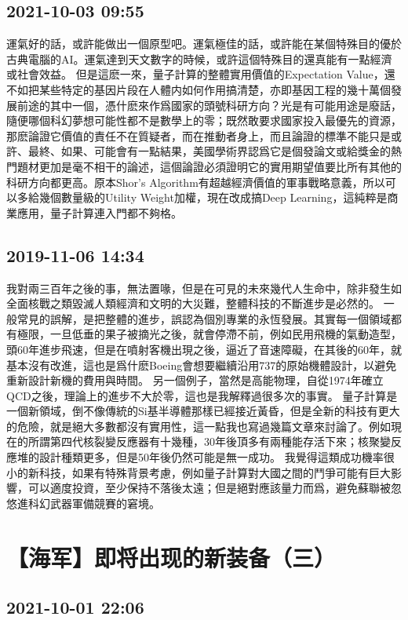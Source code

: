 \documentclass[twocolumn]{ctexart}
\begin{document}
\subsection*{2021-10-03 09:55}

運氣好的話，或許能做出一個原型吧。運氣極佳的話，或許能在某個特殊目的優於古典電腦的AI。運氣達到天文數字的時候，或許這個特殊目的還真能有一點經濟或社會效益。
但是這麽一來，量子計算的整體實用價值的Expectation Value，還不如把某些特定的基因片段在人體内如何作用搞清楚，亦即基因工程的幾十萬個發展前途的其中一個，憑什麽來作爲國家的頭號科研方向？光是有可能用途是廢話，隨便哪個科幻夢想可能性都不是數學上的零；既然敢要求國家投入最優先的資源，那麽論證它價值的責任不在質疑者，而在推動者身上，而且論證的標準不能只是或許、最終、如果、可能會有一點結果，美國學術界認爲它是個發論文或給獎金的熱門題材更加是毫不相干的論述，這個論證必須證明它的實用期望值要比所有其他的科研方向都更高。原本Shor's Algorithm有超越經濟價值的軍事戰略意義，所以可以多給幾個數量級的Utility Weight加權，現在改成搞Deep Learning，這純粹是商業應用，量子計算連入門都不夠格。
\subsection*{2019-11-06 14:34}

我對兩三百年之後的事，無法置喙，但是在可見的未來幾代人生命中，除非發生如全面核戰之類毀滅人類經濟和文明的大災難，整體科技的不斷進步是必然的。
一般常見的誤解，是把整體的進步，誤認為個別專業的永恆發展。其實每一個領域都有極限，一旦低垂的果子被摘光之後，就會停滯不前，例如民用飛機的氣動造型，頭60年進步飛速，但是在噴射客機出現之後，逼近了音速障礙，在其後的60年，就基本沒有改進，這也是爲什麽Boeing會想要繼續沿用737的原始機體設計，以避免重新設計新機的費用與時間。
另一個例子，當然是高能物理，自從1974年確立QCD之後，理論上的進步不大於零，這也是我解釋過很多次的事實。
量子計算是一個新領域，倒不像傳統的Si基半導體那樣已經接近黃昏，但是全新的科技有更大的危險，就是絕大多數都沒有實用性，這一點我也寫過幾篇文章來討論了。例如現在的所謂第四代核裂變反應器有十幾種，30年後頂多有兩種能存活下來；核聚變反應堆的設計種類更多，但是50年後仍然可能是無一成功。
我覺得這類成功機率很小的新科技，如果有特殊背景考慮，例如量子計算對大國之間的鬥爭可能有巨大影響，可以適度投資，至少保持不落後太遠；但是絕對應該量力而爲，避免蘇聯被忽悠進科幻武器軍備競賽的窘境。
\section*{【海军】即将出现的新装备（三）}
\subsection*{2021-10-01 22:06}
\end{document}
